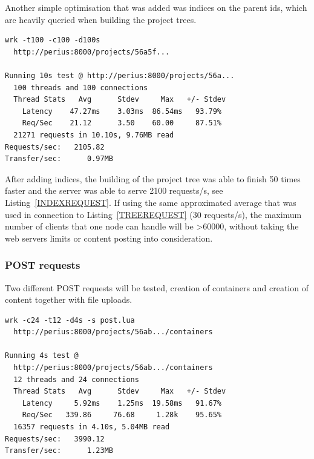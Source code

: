 \documentclass[a4paper,12pt]{article}
\begin{document}
\par
Another simple optimisation that was added was indices on the parent ids, which are heavily queried
when building the project trees.

\begin{minipage}{\linewidth-1cm}
\begin{lstlisting}[label=INDEXREQUEST,caption=Result of indexed project tree requests]
wrk -t100 -c100 -d100s 
  http://perius:8000/projects/56a5f...
 
Running 10s test @ http://perius:8000/projects/56a...
  100 threads and 100 connections
  Thread Stats   Avg      Stdev     Max   +/- Stdev
    Latency    47.27ms    3.03ms  86.54ms   93.79%
    Req/Sec    21.12      3.50    60.00     87.51%
  21271 requests in 10.10s, 9.76MB read
Requests/sec:   2105.82
Transfer/sec:      0.97MB
\end{lstlisting}
\end{minipage}

After adding indices, the building of the project tree was able to finish 50 times faster and the
server was able to serve 2100 requests/s, see Listing~\ref{INDEXREQUEST}. If using the same
approximated average that was used in connection to Listing~\ref{TREEREQUEST} (30 requests/s), the
maximum number of clients that one node can handle will be >60000, without taking the web servers
limits or content posting into consideration.

\subsubsection{POST requests}
Two different POST requests will be tested, creation of containers and creation of content together
with file uploads. 

\begin{minipage}{\linewidth-1cm}
\begin{lstlisting}[label=CONTAINERPOSTREQUEST,caption=Result of container creation]
wrk -c24 -t12 -d4s -s post.lua 
  http://perius:8000/projects/56ab.../containers 
  
Running 4s test @ 
  http://perius:8000/projects/56ab.../containers
  12 threads and 24 connections
  Thread Stats   Avg      Stdev     Max   +/- Stdev
    Latency     5.92ms    1.25ms  19.58ms   91.67%
    Req/Sec   339.86     76.68     1.28k    95.65%
  16357 requests in 4.10s, 5.04MB read
Requests/sec:   3990.12
Transfer/sec:      1.23MB
\end{lstlisting}
\end{minipage}
\end{document}
